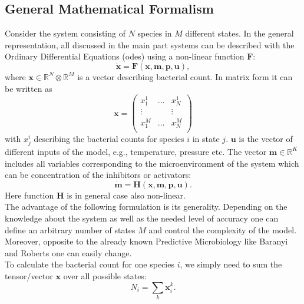 \documentclass[10pt,twocolumn,5p]{elsarticle}
\numberwithin{equation}{section}
\newcommand{\mbx}{\mathbf{x}}
\newcommand{\mbm}{\mathbf{m}}
\newcommand{\mbp}{\mathbf{p}}
\newcommand{\mbu}{\mathbf{u}}
\newcommand{\mbF}{\mathbf{F}}
\newcommand{\mbH}{\mathbf{H}}
\begin{document}
\subsection{General Mathematical Formalism}  \label{ssec:supplement1}
Consider the system consisting of $N$ species in $M$ different states.
In the general representation, all discussed in the main part systems  can be described with the Ordinary Differential Equations (\acp{ode}) using a non-linear function $\mbF$:
\begin{equation}
   \dot{\mbx} = \mbF(\mbx, \mbm, \mbp, \mbu),
\label{eq:model_ODE_x}
\end{equation}
where  $\mbx \in \mathbb{R}^{N}  \otimes \mathbb{R}^{M}$ is a vector describing bacterial count.
In matrix form it can be written as
\begin{equation}
    \mbx = \begin{pmatrix}
        x^1_1  & \dots & x^1_N  \\
        \vdots &       & \vdots \\
        x^M_1  & \dots & x^M_N  \\
            \end{pmatrix}
    \label{eq:model_bact}
\end{equation}
with $x_{j}^{i}$ describing the bacterial counts for species $i$ in state $j$.
$\mbu$ is the vector of different inputs of the model, e.g., temperature, pressure etc.
The vector $\mbm \in \mathbb{R}^{K}$ includes all variables corresponding to the microenvironment of the system which can be concentration of the inhibitors or activators:
\begin{equation}
    \dot{\mbm} = \mbH (\mbx, \mbm, \mbp, \mbu).
    \label{eq:model_microenv}
\end{equation}
Here function $\mbH$ is in general case also non-linear.\\
%
The advantage of the following formulation is its generality.
Depending on the knowledge about the system as well as the needed level of accuracy one can define an arbitrary number of states $M$ and control the complexity of the model.
Moreover, opposite to the already known Predictive Microbiology like Baranyi and Roberts one can easily change.\\
%
To calculate the bacterial count for one species $i$, we simply need to sum the tensor/vector $\mbx$ over all possible states:
\begin{equation}
    N_i = \sum_k \mbx_i^k.
\label{eq:N_pro_species}
\end{equation}
\end{document}
